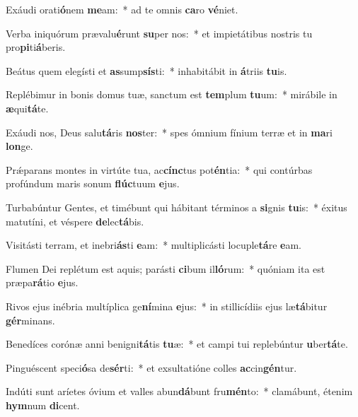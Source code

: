 \item Exáudi orati\textbf{ó}nem \textbf{me}am:~* ad te omnis \textbf{ca}ro \textbf{vé}niet.
\item Verba iniquórum prævalu\textbf{é}runt \textbf{su}per nos:~* et impietátibus nostris tu pro\textbf{pi}ti\textbf{á}beris.
\item Beátus quem elegísti et \textbf{as}sump\textbf{sís}ti:~* inhabitábit in \textbf{á}triis \textbf{tu}is.
\item Replébimur in bonis domus tuæ, sanctum est \textbf{tem}plum \textbf{tu}um:~* mirábile in \textbf{æ}qui\textbf{tá}te.
\item Exáudi nos, Deus salu\textbf{tá}ris \textbf{nos}ter:~* spes ómnium fínium terræ et in \textbf{ma}ri \textbf{lon}ge.
\item Prǽparans montes in virtúte tua, ac\textbf{cínc}tus pot\textbf{én}tia:~* qui contúrbas profúndum maris sonum \textbf{flúc}tuum \textbf{e}jus.
\item Turbabúntur Gentes, et timébunt qui hábitant términos a \textbf{si}gnis \textbf{tu}is:~* éxitus matutíni, et véspere \textbf{de}lec\textbf{tá}bis.
\item Visitásti terram, et inebri\textbf{ás}ti \textbf{e}am:~* multiplicásti locuple\textbf{tá}re \textbf{e}am.
\item Flumen Dei replétum est aquis; parásti \textbf{ci}bum il\textbf{ló}rum:~* quóniam ita est præpa\textbf{rá}tio \textbf{e}jus.
\item Rivos ejus inébria multíplica ge\textbf{ní}mina \textbf{e}jus:~* in stillicídiis ejus læ\textbf{tá}bitur \textbf{gér}minans.
\item Benedíces corónæ anni benigni\textbf{tá}tis \textbf{tu}æ:~* et campi tui replebúntur \textbf{u}ber\textbf{tá}te.
\item Pinguéscent speci\textbf{ó}sa de\textbf{sér}ti:~* et exsultatióne colles \textbf{ac}cin\textbf{gén}tur.
\item Indúti sunt aríetes óvium et valles abun\textbf{dá}bunt fru\textbf{mén}to:~* clamábunt, étenim \textbf{hym}num \textbf{di}cent.
